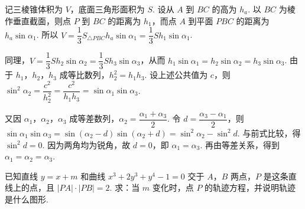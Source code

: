 \documentclass[UTF8,a4paper,oneside,11pt]{ctexbook}
\begin{document}
\begin{solution}
记三棱锥体积为 \(V\)，底面三角形面积为 \(S\). 设从 \(A\) 到 \(BC\) 的高为 \(h_a\). 以 \(BC\) 为棱作垂直截面，则点 \(P\) 到 \(BC\) 的距离为 \(h_1\)，而点 \(A\) 到平面 \(PBC\) 的距离为 \(h_a\sin\alpha_1\). 所以
\(V=\dfrac13S_{\triangle PBC}h_a\sin\alpha_1=\dfrac13S h_1\sin\alpha_1\).

同理，\(V=\dfrac13S h_2\sin\alpha_2=\dfrac13S h_3\sin\alpha_3\)，从而
\(h_1\sin\alpha_1=h_2\sin\alpha_2=h_3\sin\alpha_3\). 由于 \(h_1\)，\(h_2\)，\(h_3\) 成等比数列，\(h_2^2=h_1h_3\). 设上述公共值为 \(c\)，则
\(\sin^2\alpha_2=\dfrac{c^2}{h_2^2}=\dfrac{c^2}{h_1h_3}=\sin\alpha_1\sin\alpha_3\).

又因 \(\alpha_1\)，\(\alpha_2\)，\(\alpha_3\) 成等差数列，\(\alpha_2=\dfrac{\alpha_1+\alpha_3}{2}\). 令 \(d=\dfrac{\alpha_3-\alpha_1}{2}\)，则
\(\sin\alpha_1\sin\alpha_3=\sin\left(\alpha_2-d\right)\sin\left(\alpha_2+d\right)=\sin^2\alpha_2-\sin^2d\). 与前式比较，得 \(\sin^2d=0\). 因为两角均为锐角，故 \(d=0\)，即 \(\alpha_1=\alpha_3\). 再由等差关系，得到 \(\alpha_1=\alpha_2=\alpha_3\).
\end{solution}

\begin{problem}

已知直线 \(y=x+m\) 和曲线 \(x^3+2y^3+y^4-1=0\) 交于 \(A\)，\(B\) 两点，\(P\) 是这条直线上的点，且 \(\left|PA\right|\cdot\left|PB\right|=2\). 求：当 \(m\) 变化时，点 \(P\) 的轨迹方程，并说明轨迹是什么图形.
\end{problem}
\end{document}
